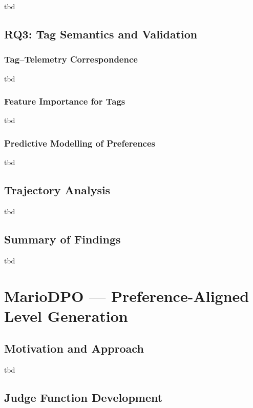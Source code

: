 \documentclass[shortabstract, mgr, english]{iithesis}
\begin{document}
tbd

\section{RQ3: Tag Semantics and Validation}
\label{sec:eda-rq3}

\subsection{Tag--Telemetry Correspondence}
\label{subsec:eda-h6}

tbd

\subsection{Feature Importance for Tags}
\label{subsec:eda-h7}

tbd

\subsection{Predictive Modelling of Preferences}
\label{subsec:eda-h10}

tbd

\section{Trajectory Analysis}
\label{sec:eda-trajectories}

tbd

\section{Summary of Findings}
\label{sec:eda-summary}

tbd



\chapter{MarioDPO --- Preference-Aligned Level Generation}
\label{ch:mariodpo}


\section{Motivation and Approach}
\label{sec:dpo-motivation}

tbd

\section{Judge Function Development}
\label{sec:dpo-judge}
\end{document}
